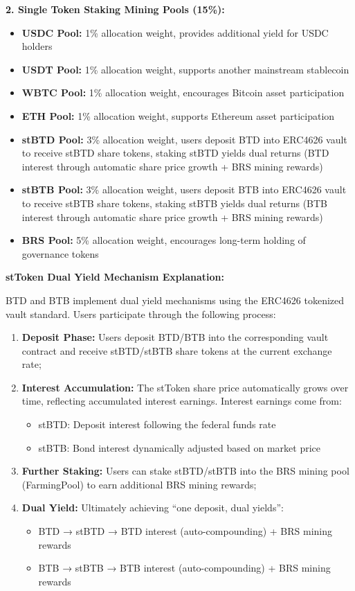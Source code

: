 \documentclass{article}
\begin{document}
\textbf{2. Single Token Staking Mining Pools (15\%):}
\begin{itemize}
  \item \textbf{USDC Pool:} 1\% allocation weight, provides additional yield for USDC holders
  \item \textbf{USDT Pool:} 1\% allocation weight, supports another mainstream stablecoin
  \item \textbf{WBTC Pool:} 1\% allocation weight, encourages Bitcoin asset participation
  \item \textbf{ETH Pool:} 1\% allocation weight, supports Ethereum asset participation
  \item \textbf{stBTD Pool:} 3\% allocation weight, users deposit BTD into ERC4626 vault to receive stBTD share tokens, staking stBTD yields dual returns (BTD interest through automatic share price growth + BRS mining rewards)
  \item \textbf{stBTB Pool:} 3\% allocation weight, users deposit BTB into ERC4626 vault to receive stBTB share tokens, staking stBTB yields dual returns (BTB interest through automatic share price growth + BRS mining rewards)
  \item \textbf{BRS Pool:} 5\% allocation weight, encourages long-term holding of governance tokens
\end{itemize}

\textbf{stToken Dual Yield Mechanism Explanation:}

BTD and BTB implement dual yield mechanisms using the ERC4626 tokenized vault standard. Users participate through the following process:

\begin{enumerate}
  \item \textbf{Deposit Phase:} Users deposit BTD/BTB into the corresponding vault contract and receive stBTD/stBTB share tokens at the current exchange rate;
  \item \textbf{Interest Accumulation:} The stToken share price automatically grows over time, reflecting accumulated interest earnings. Interest earnings come from:
    \begin{itemize}
      \item stBTD: Deposit interest following the federal funds rate
      \item stBTB: Bond interest dynamically adjusted based on market price
    \end{itemize}
  \item \textbf{Further Staking:} Users can stake stBTD/stBTB into the BRS mining pool (FarmingPool) to earn additional BRS mining rewards;
  \item \textbf{Dual Yield:} Ultimately achieving ``one deposit, dual yields'':
    \begin{itemize}
      \item BTD → stBTD → BTD interest (auto-compounding) + BRS mining rewards
      \item BTB → stBTB → BTB interest (auto-compounding) + BRS mining rewards
    \end{itemize}
\end{enumerate}
\end{document}
